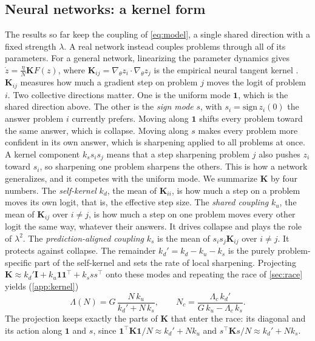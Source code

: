 \subsection{Neural networks: a kernel form}
\label{sec:kernel}
The results so far keep the coupling of \cref{eq:model}, a single shared direction with a fixed strength $\lambda$. A real network instead couples problems through all of its parameters.
For a general network, linearizing the parameter dynamics gives $\dot z=\frac{\eta}{N}\mathbf K F(z)$, where $\mathbf K_{ij}=\nabla_\theta z_i\!\cdot\!\nabla_\theta z_j$ is the empirical neural tangent kernel \citep{jacot2018ntk}. $\mathbf K_{ij}$ measures how much a gradient step on problem $j$ moves the logit of problem $i$.
Two collective directions matter. One is the uniform mode $\mathbf 1$, which is the shared direction above. The other is the \emph{sign mode} $s$, with $s_i=\mathrm{sign}\,z_i(0)$ the answer problem $i$ currently prefers.
Moving along $\mathbf 1$ shifts every problem toward the same answer, which is collapse. Moving along $s$ makes every problem more confident in its own answer, which is sharpening applied to all problems at once.
A kernel component $k_s s_is_j$ means that a step sharpening problem $j$ also pushes $z_i$ toward $s_i$, so sharpening one problem sharpens the others. This is how a network generalizes, and it competes with the uniform mode.
We summarize $\mathbf K$ by four numbers.
The \emph{self-kernel} $k_d$, the mean of $\mathbf K_{ii}$, is how much a step on a problem moves its own logit, that is, the effective step size.
The \emph{shared coupling} $k_u$, the mean of $\mathbf K_{ij}$ over $i\ne j$, is how much a step on one problem moves every other logit the same way, whatever their answers. It drives collapse and plays the role of $\lambda^2$.
The \emph{prediction-aligned coupling} $k_s$ is the mean of $s_is_j\mathbf K_{ij}$ over $i\ne j$. It protects against collapse.
The remainder $k_d'=k_d-k_u-k_s$ is the purely problem-specific part of the self-kernel and sets the rate of local sharpening.
Projecting $\mathbf K\approx k_d'\mathbf I+k_u\mathbf 1\mathbf 1^\top+k_s ss^\top$ onto these modes and repeating the race of \cref{sec:race} yields (\cref{app:kernel})
\begin{equation}
  \Lambda(N)=G\,\frac{N\,k_u}{k_d'+N\,k_s},\qquad
  N_c=\frac{\Lambda_c\,k_d'}{G\,k_u-\Lambda_c\,k_s}.
  \label{eq:kernel}
\end{equation}
The projection keeps exactly the parts of $\mathbf K$ that enter the race: its diagonal and its action along $\mathbf 1$ and $s$, since $\mathbf 1^\top\mathbf K\mathbf 1/N\approx k_d'+Nk_u$ and $s^\top\mathbf K s/N\approx k_d'+Nk_s$.

